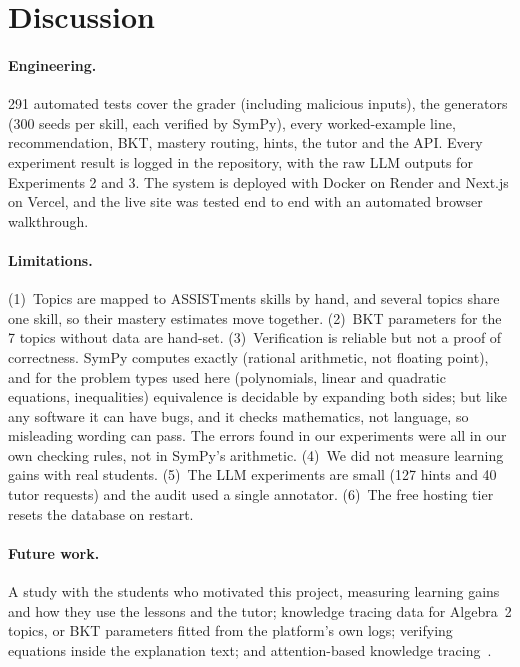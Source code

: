 \documentclass[11pt]{article}
\begin{document}
\section{Discussion}
\paragraph{Engineering.} 291 automated tests cover the grader (including malicious inputs), the generators (300 seeds per skill, each verified by SymPy), every worked-example line, recommendation, BKT, mastery routing, hints, the tutor and the API. Every experiment result is logged in the repository, with the raw LLM outputs for Experiments 2 and 3. The system is deployed with Docker on Render and Next.js on Vercel, and the live site was tested end to end with an automated browser walkthrough.

\paragraph{Limitations.} (1)~Topics are mapped to ASSISTments skills by hand, and several topics share one skill, so their mastery estimates move together. (2)~BKT parameters for the 7 topics without data are hand-set. (3)~Verification is reliable but not a proof of correctness. SymPy computes exactly (rational arithmetic, not floating point), and for the problem types used here (polynomials, linear and quadratic equations, inequalities) equivalence is decidable by expanding both sides; but like any software it can have bugs, and it checks mathematics, not language, so misleading wording can pass. The errors found in our experiments were all in our own checking rules, not in SymPy's arithmetic. (4)~We did not measure learning gains with real students. (5)~The LLM experiments are small (127 hints and 40 tutor requests) and the audit used a single annotator. (6)~The free hosting tier resets the database on restart.

\paragraph{Future work.} A study with the students who motivated this project, measuring learning gains and how they use the lessons and the tutor; knowledge tracing data for Algebra~2 topics, or BKT parameters fitted from the platform's own logs; verifying equations inside the explanation text; and attention-based knowledge tracing~\cite{pandey2019sakt}.
\end{document}
